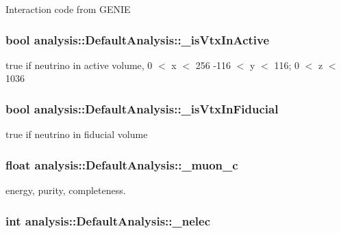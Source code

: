 Interaction code from G\-E\-N\-I\-E \hypertarget{classanalysis_1_1DefaultAnalysis_a9c03fca7c9d596e0cb490aef4bcd3aed}{
\subsubsection[{\-\_\-is\-Vtx\-In\-Active}]{\setlength{\rightskip}{0pt plus 5cm}bool analysis\-::\-Default\-Analysis\-::\-\_\-is\-Vtx\-In\-Active\hspace{0.3cm}{\ttfamily [private]}}}\label{classanalysis_1_1DefaultAnalysis_a9c03fca7c9d596e0cb490aef4bcd3aed}
true if neutrino in active volume, 0 $<$ x $<$ 256 -\/116 $<$ y $<$ 116; 0 $<$ z $<$ 1036 \hypertarget{classanalysis_1_1DefaultAnalysis_a3235e005677abb89da08d1668257bca3}{
\subsubsection[{\-\_\-is\-Vtx\-In\-Fiducial}]{\setlength{\rightskip}{0pt plus 5cm}bool analysis\-::\-Default\-Analysis\-::\-\_\-is\-Vtx\-In\-Fiducial\hspace{0.3cm}{\ttfamily [private]}}}\label{classanalysis_1_1DefaultAnalysis_a3235e005677abb89da08d1668257bca3}
true if neutrino in fiducial volume \hypertarget{classanalysis_1_1DefaultAnalysis_ac6226239ce3915d1363f8038583e8960}{
\subsubsection[{\-\_\-muon\-\_\-c}]{\setlength{\rightskip}{0pt plus 5cm}float analysis\-::\-Default\-Analysis\-::\-\_\-muon\-\_\-c\hspace{0.3cm}{\ttfamily [private]}}}\label{classanalysis_1_1DefaultAnalysis_ac6226239ce3915d1363f8038583e8960}
energy, purity, completeness. \hypertarget{classanalysis_1_1DefaultAnalysis_a6aa372d8781339f60a044c92d974ae53}{
\subsubsection[{\-\_\-nelec}]{\setlength{\rightskip}{0pt plus 5cm}int analysis\-::\-Default\-Analysis\-::\-\_\-nelec\hspace{0.3cm}{\ttfamily [private]}}}\label{classanalysis_1_1DefaultAnalysis_a6aa372d8781339f60a044c92d974ae53}
